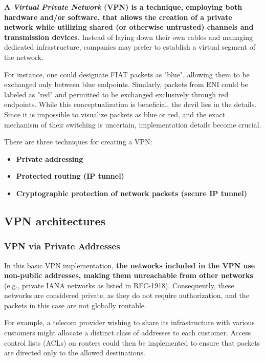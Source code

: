 \textbf{A \textit{Virtual Private Network} (VPN) is a technique, employing both hardware and/or software, that allows the creation of a private network while utilizing shared (or otherwise untrusted) channels and transmission devices}.
Instead of laying down their own cables and managing dedicated infrastructure, companies may prefer to establish a virtual segment of the network.

For instance, one could designate FIAT packets as "blue", allowing them to be exchanged only between blue endpoints. Similarly, packets from ENI could be labeled as "red" and permitted to be exchanged exclusively through red endpoints. While this conceptualization is beneficial, the devil lies in the details. Since it is impossible to visualize packets as blue or red, and the exact mechanism of their switching is uncertain, implementation details become crucial.

There are three techniques for creating a VPN:
\begin{itemize}
	\item \textbf{Private addressing}
	\item \textbf{Protected routing (IP tunnel)}
	\item \textbf{Cryptographic protection of network packets (secure IP tunnel)}
\end{itemize}

\subsection{VPN architectures}

\subsubsection{VPN via Private Addresses}

In this basic VPN implementation, \textbf{the networks included in the VPN use non-public addresses, making them unreachable from other networks} (e.g., private IANA networks as listed in RFC-1918). Consequently, these networks are considered private, as they do not require authorization, and the packets in this case are not globally routable.

For example, a telecom provider wishing to share its infrastructure with various customers might allocate a distinct class of addresses to each customer. Access control lists (ACLs) on routers could then be implemented to ensure that packets are directed only to the allowed destinations.

